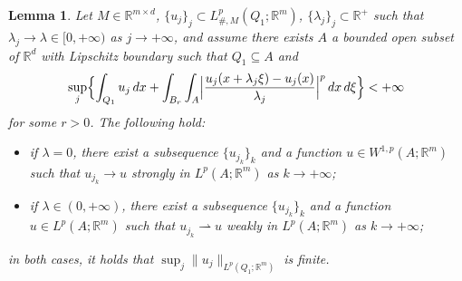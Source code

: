 \documentclass{article}
\newtheorem{lemma}{Lemma}[section]
\theoremstyle{definition}
\newcommand{\R}{\mathbb{R}}
\begin{document}
\begin{lemma} \label{lemma : compactness}
    Let $M\in \R^{m\times d}$, $\{u_j\}_j\subset L^p_{\#,M}(Q_1;\R^m)$, $\{\lambda_j\}_j\subset \R^+$ such that $\lambda_j\to \lambda\in[0,+\infty)$ as $j\to+\infty$, and assume there exists $A$ a bounded open subset of $\R^d$ with Lipschitz boundary such that $Q_1\subseteq A$ and
    \begin{equation*}
        \sup_{j} \Bigl\{ \int_{Q_1} u_j\, dx + \int_{B_r}\int_{A}\Bigl|\frac{u_j(x+\lambda_j\xi)-u_j(x)}{\lambda_j}\Bigr|^p\, dx\, d\xi \Bigr\}<+\infty
    \end{equation*}
    for some $r>0$.
    The following hold:
    \begin{itemize}
        \item[(i)] if $\lambda=0$, there exist a subsequence $\{u_{j_k}\}_k$ and a function $u\in W^{1,p}(A;\R^m)$ such that $u_{j_k}\to u$ strongly in $L^p(A;\R^m)$ as $k\to+\infty$;
        \item[(ii)] if $\lambda\in(0,+\infty)$, there exist a subsequence $\{u_{j_k}\}_k$ and a function $u\in L^{p}(A;\R^m)$ such that $u_{j_k}\rightharpoonup u$ weakly in $L^p(A;\R^m)$ as $k\to+\infty$;
    \end{itemize}
    in both cases, it holds that $\sup_j \|u_j\|_{L^p(Q_1;\R^m)}$ is finite.
\end{lemma}
\end{document}
